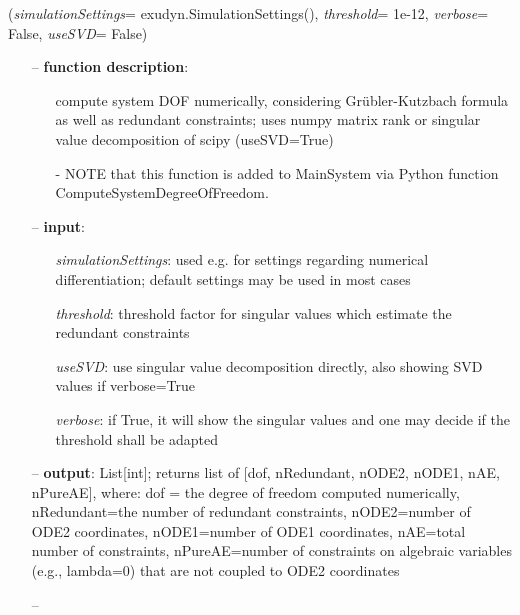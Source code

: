 %
\begin{flushleft}
\label{sec:mainsystemextensions:ComputeSystemDegreeOfFreedom}
({\it simulationSettings}= exudyn.SimulationSettings(), {\it threshold}= 1e-12, {\it verbose}= False, {\it useSVD}= False)
\end{flushleft}
\setlength{\itemindent}{0.7cm}
\begin{itemize}[leftmargin=0.7cm]
\item[--]
{\bf function description}: \vspace{-6pt}
\begin{itemize}[leftmargin=1.2cm]
\setlength{\itemindent}{-0.7cm}
\item[]compute system DOF numerically, considering Gr{\"u}bler-Kutzbach formula as well as redundant constraints; uses numpy matrix rank or singular value decomposition of scipy (useSVD=True)
\item[]- NOTE that this function is added to MainSystem via Python function ComputeSystemDegreeOfFreedom.
\end{itemize}
\item[--]
{\bf input}: \vspace{-6pt}
\begin{itemize}[leftmargin=1.2cm]
\setlength{\itemindent}{-0.7cm}
\item[]{\it simulationSettings}: used e.g. for settings regarding numerical differentiation; default settings may be used in most cases
\item[]{\it threshold}: threshold factor for singular values which estimate the redundant constraints
\item[]{\it useSVD}: use singular value decomposition directly, also showing SVD values if verbose=True
\item[]{\it verbose}: if True, it will show the singular values and one may decide if the threshold shall be adapted
\end{itemize}
\item[--]
{\bf output}: List[int]; returns list of [dof, nRedundant, nODE2, nODE1, nAE, nPureAE], where: dof = the degree of freedom computed numerically, nRedundant=the number of redundant constraints, nODE2=number of ODE2 coordinates, nODE1=number of ODE1 coordinates, nAE=total number of constraints, nPureAE=number of constraints on algebraic variables (e.g., lambda=0) that are not coupled to ODE2 coordinates
\item[--]

\end{itemize}
